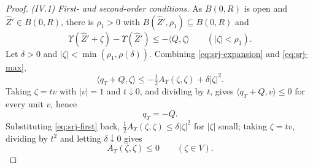 \begin{proof}
\emph{(IV.1) First- and second-order conditions.}
As $B(0,R)$ is open and $\widehat Z'\in B(0,R)$, there is $\rho_1>0$ with
$B(\widehat Z',\rho_1)\subseteq B(0,R)$ and
\begin{equation}\label{eq:srj-max}
  \Upsilon(\widehat Z'+\zeta)-\Upsilon(\widehat Z')\le-\langle Q,\zeta\rangle
  \qquad(|\zeta|<\rho_1).
\end{equation}
Let $\delta>0$ and $|\zeta|<\min(\rho_1,\rho(\delta))$. Combining
\eqref{eq:srj-expansion} and \eqref{eq:srj-max},
\[
  \langle q_\Upsilon+Q,\zeta\rangle
   \le-\tfrac12A_\Upsilon(\zeta,\zeta)+\delta|\zeta|^2 .
\]
Taking $\zeta=tv$ with $|v|=1$ and $t\downarrow0$, and dividing by $t$, gives
$\langle q_\Upsilon+Q,v\rangle\le0$ for every unit $v$, hence
\begin{equation}\label{eq:srj-first}
  q_\Upsilon=-Q .
\end{equation}
Substituting \eqref{eq:srj-first} back, $\tfrac12A_\Upsilon(\zeta,\zeta)
\le\delta|\zeta|^2$ for $|\zeta|$ small; taking $\zeta=tv$, dividing by $t^2$
and letting $\delta\downarrow0$ gives
\begin{equation}\label{eq:srj-second}
  A_\Upsilon(\zeta,\zeta)\le0\qquad(\zeta\in V).
\end{equation}


\end{proof}
